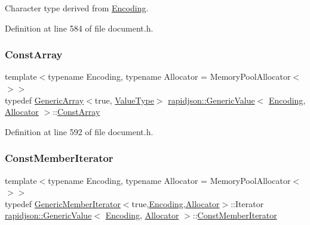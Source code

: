 Character type derived from \mbox{\hyperlink{classrapidjson_1_1_encoding}{Encoding}}. 



Definition at line 584 of file document.\+h.

\mbox{\label{classrapidjson_1_1_generic_value_a8fb89523de7b22be0c69069f05d04b41}} 
\subsubsection{\texorpdfstring{ConstArray}{ConstArray}}
{\footnotesize\ttfamily template$<$typename Encoding, typename Allocator = Memory\+Pool\+Allocator$<$$>$$>$ \\
typedef \mbox{\hyperlink{classrapidjson_1_1_generic_array}{Generic\+Array}}$<$true, \mbox{\hyperlink{classrapidjson_1_1_generic_value_ad2935191ab28c2c2e472b739a9d58202}{Value\+Type}}$>$ \mbox{\hyperlink{classrapidjson_1_1_generic_value}{rapidjson\+::\+Generic\+Value}}$<$ \mbox{\hyperlink{classrapidjson_1_1_encoding}{Encoding}}, \mbox{\hyperlink{classrapidjson_1_1_allocator}{Allocator}} $>$\+::\mbox{\hyperlink{classrapidjson_1_1_generic_value_a8fb89523de7b22be0c69069f05d04b41}{Const\+Array}}}



Definition at line 592 of file document.\+h.

\mbox{\label{classrapidjson_1_1_generic_value_a6cd2b09795c48d2892bebc0ae350d51f}} 
\subsubsection{\texorpdfstring{ConstMemberIterator}{ConstMemberIterator}}
{\footnotesize\ttfamily template$<$typename Encoding, typename Allocator = Memory\+Pool\+Allocator$<$$>$$>$ \\
typedef \mbox{\hyperlink{classrapidjson_1_1_generic_member_iterator}{Generic\+Member\+Iterator}}$<$true,\mbox{\hyperlink{classrapidjson_1_1_encoding}{Encoding}},\mbox{\hyperlink{classrapidjson_1_1_allocator}{Allocator}}$>$\+::Iterator \mbox{\hyperlink{classrapidjson_1_1_generic_value}{rapidjson\+::\+Generic\+Value}}$<$ \mbox{\hyperlink{classrapidjson_1_1_encoding}{Encoding}}, \mbox{\hyperlink{classrapidjson_1_1_allocator}{Allocator}} $>$\+::\mbox{\hyperlink{classrapidjson_1_1_generic_value_a6cd2b09795c48d2892bebc0ae350d51f}{Const\+Member\+Iterator}}}



